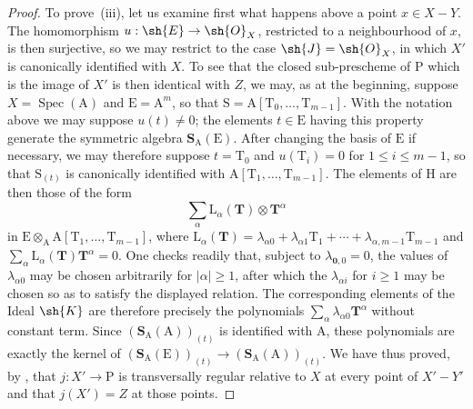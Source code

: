 \begin{proof}
To prove~(iii), let us examine first what happens above a point $x\in X-Y$.
The homomorphism $u:\sh{E}\to\sh{O}_X$, restricted to a neighbourhood of $x$, is then surjective, so we may restrict to the case $\sh{J}=\sh{O}_X$, in which $X'$ is canonically identified with $X$.
To see that the closed sub-prescheme of $\mathrm{P}$ which is the image of $X'$ is then identical with $Z$, we may, as at the beginning, suppose $X=\operatorname{Spec}(\mathrm{A})$ and $\mathrm{E}=\mathrm{A}^m$, so that $\mathrm{S}=\mathrm{A}[\mathrm{T}_0,\ldots,\mathrm{T}_{m-1}]$.
With the notation above we may suppose $u(t)\ne0$; the elements $t\in\mathrm{E}$ having this property generate the symmetric algebra $\mathbf{S}_\mathrm{A}(\mathrm{E})$.
After changing the basis of $\mathrm{E}$ if necessary, we may therefore suppose $t=\mathrm{T}_0$ and $u(\mathrm{T}_i)=0$ for $1\leq i\leq m-1$, so that $\mathrm{S}_{(t)}$ is canonically identified with $\mathrm{A}[\mathrm{T}_1,\ldots,\mathrm{T}_{m-1}]$.
The elements of $\mathrm{H}$ are then those of the form
\[
  \sum_\alpha \mathrm{L}_\alpha(\mathbf{T})\otimes\mathbf{T}^\alpha
\]
in $\mathrm{E}\otimes_\mathrm{A}\mathrm{A}[\mathrm{T}_1,\ldots,\mathrm{T}_{m-1}]$, where
$\mathrm{L}_\alpha(\mathbf{T})=\lambda_{\alpha0}+\lambda_{\alpha1}\mathrm{T}_1+\cdots+\lambda_{\alpha,m-1}\mathrm{T}_{m-1}$ and
$\sum_\alpha\mathrm{L}_\alpha(\mathbf{T})\mathbf{T}^\alpha=0$.
One checks readily that, subject to $\lambda_{\mathbf{0},0}=0$, the values of $\lambda_{\alpha0}$ may be chosen arbitrarily for $|\alpha|\geq1$, after which the $\lambda_{\alpha i}$ for $i\geq1$ may be chosen so as to satisfy the displayed relation.
The corresponding elements of the Ideal $\sh{K}$ are therefore precisely the polynomials
$\sum_\alpha\lambda_{\alpha0}\mathbf{T}^\alpha$ without constant term.
Since $(\mathbf{S}_\mathrm{A}(\mathrm{A}))_{(t)}$ is identified with $\mathrm{A}$, these polynomials are exactly the kernel of
$(\mathbf{S}_\mathrm{A}(\mathrm{E}))_{(t)}\to(\mathbf{S}_\mathrm{A}(\mathrm{A}))_{(t)}$.
We have thus proved, by , that $j:X'\to\mathrm{P}$ is transversally regular relative to $X$ at every point of $X'-Y'$ and that $j(X')=Z$ at those points.


\end{proof}
